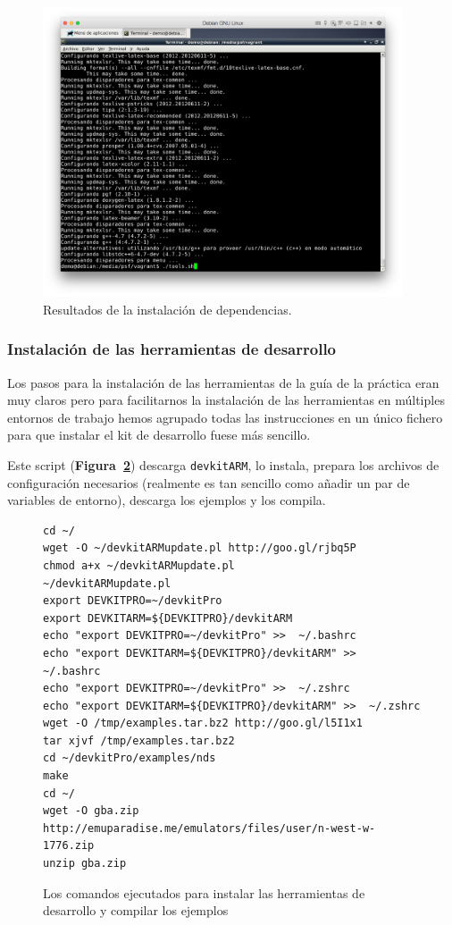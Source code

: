 \begin{figure}[h!]
	\caption{Resultados de la instalación de dependencias.}
	\label{fig:dependency}
	\centering
	\includegraphics[width=0.95\textwidth]{P1Media/Dependencias}
\end{figure}
	
	\subsubsection{Instalación de las herramientas de desarrollo}
	
	Los pasos para la instalación de las herramientas de la guía de la práctica eran muy claros pero para facilitarnos la instalación de las herramientas en múltiples entornos de trabajo hemos agrupado todas las instrucciones en un único fichero para que instalar el kit de desarrollo fuese más sencillo.
	
	Este script (\textbf{Figura~\ref{fig:installToolkit}}) descarga {\tt devkitARM}, lo instala, prepara los archivos de configuración necesarios (realmente es tan sencillo como añadir un par de variables de entorno), descarga los ejemplos y los compila.
	
\begin{figure}[ht]
\begin{mdframed}[style=exampledefault]
\begin{verbatim}
cd ~/
wget -O ~/devkitARMupdate.pl http://goo.gl/rjbq5P
chmod a+x ~/devkitARMupdate.pl
~/devkitARMupdate.pl
export DEVKITPRO=~/devkitPro
export DEVKITARM=${DEVKITPRO}/devkitARM
echo "export DEVKITPRO=~/devkitPro" >>  ~/.bashrc
echo "export DEVKITARM=${DEVKITPRO}/devkitARM" >>  ~/.bashrc
echo "export DEVKITPRO=~/devkitPro" >>  ~/.zshrc
echo "export DEVKITARM=${DEVKITPRO}/devkitARM" >>  ~/.zshrc
wget -O /tmp/examples.tar.bz2 http://goo.gl/l5I1x1
tar xjvf /tmp/examples.tar.bz2
cd ~/devkitPro/examples/nds
make
cd ~/
wget -O gba.zip http://emuparadise.me/emulators/files/user/n-west-w-1776.zip
unzip gba.zip
\end{verbatim}
\end{mdframed}

	\caption{Los comandos ejecutados para instalar las herramientas de desarrollo y compilar los ejemplos}
	\label{fig:installToolkit}
\end{figure}


